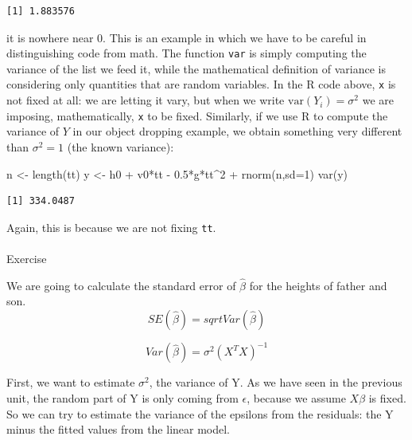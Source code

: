 \documentclass[
  letterpaper,
  DIV=11,
  numbers=noendperiod]{scrartcl}
\makeatletter
\let\oldparagraph\paragraph
\renewcommand{\paragraph}{
    \@ifstar
      \xxxParagraphStar
      \xxxParagraphNoStar
  }
\newcommand{\xxxParagraphStar}[1]{\oldparagraph*{#1}\mbox{}}
\newcommand{\xxxParagraphNoStar}[1]{\oldparagraph{#1}\mbox{}}
\newenvironment{Shaded}{\begin{snugshade}}{\end{snugshade}}
\newcommand{\AttributeTok}[1]{\textcolor[rgb]{0.40,0.45,0.13}{#1}}
\newcommand{\DecValTok}[1]{\textcolor[rgb]{0.68,0.00,0.00}{#1}}
\newcommand{\FloatTok}[1]{\textcolor[rgb]{0.68,0.00,0.00}{#1}}
\newcommand{\FunctionTok}[1]{\textcolor[rgb]{0.28,0.35,0.67}{#1}}
\newcommand{\NormalTok}[1]{\textcolor[rgb]{0.00,0.23,0.31}{#1}}
\newcommand{\OtherTok}[1]{\textcolor[rgb]{0.00,0.23,0.31}{#1}}
\newcommand{\SpecialCharTok}[1]{\textcolor[rgb]{0.37,0.37,0.37}{#1}}
\makeatother
\begin{document}
\begin{verbatim}
[1] 1.883576
\end{verbatim}

it is nowhere near 0. This is an example in which we have to be careful
in distinguishing code from math. The function \texttt{var} is simply
computing the variance of the list we feed it, while the mathematical
definition of variance is considering only quantities that are random
variables. In the R code above, \texttt{x} is not fixed at all: we are
letting it vary, but when we write \(\mbox{var}(Y_i) = \sigma^2\) we are
imposing, mathematically, \texttt{x} to be fixed. Similarly, if we use R
to compute the variance of \(Y\) in our object dropping example, we
obtain something very different than \(\sigma^2=1\) (the known
variance):

\begin{Shaded}
\begin{Highlighting}[]
\NormalTok{n }\OtherTok{\textless{}{-}} \FunctionTok{length}\NormalTok{(tt)}
\NormalTok{y }\OtherTok{\textless{}{-}}\NormalTok{ h0 }\SpecialCharTok{+}\NormalTok{ v0}\SpecialCharTok{*}\NormalTok{tt  }\SpecialCharTok{{-}} \FloatTok{0.5}\SpecialCharTok{*}\NormalTok{g}\SpecialCharTok{*}\NormalTok{tt}\SpecialCharTok{\^{}}\DecValTok{2} \SpecialCharTok{+} \FunctionTok{rnorm}\NormalTok{(n,}\AttributeTok{sd=}\DecValTok{1}\NormalTok{)}
\FunctionTok{var}\NormalTok{(y)}
\end{Highlighting}
\end{Shaded}

\begin{verbatim}
[1] 334.0487
\end{verbatim}

Again, this is because we are not fixing \texttt{tt}.

\paragraph{Exercise}\label{exercise}

We are going to calculate the standard error of \(\hat{\beta}\) for the
heights of father and son. \[
SE(\hat{\beta})= sqrt{Var(\hat{\beta})}
\]

\[
Var(\hat{\beta})= \sigma^2(X^TX)^{-1}
\]

First, we want to estimate \(\sigma^2\), the variance of Y. As we have
seen in the previous unit, the random part of Y is only coming from
\(\epsilon\), because we assume \(X\beta\) is fixed. So we can try to
estimate the variance of the epsilons from the residuals: the Y minus
the fitted values from the linear model.
\end{document}
